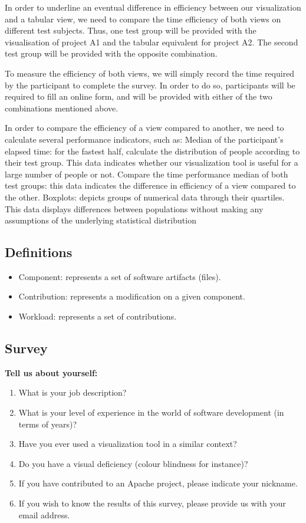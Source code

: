 In order to underline an eventual difference in efficiency between our visualization and a tabular view, we need to compare the time efficiency of both views on different test subjects. Thus, one test group will be provided with the visualisation of project A1 and the tabular equivalent for project A2. The second test group will be provided with the opposite combination.

To measure the efficiency of both views, we will simply record the time required by the participant to complete the survey. In order to do so, participants will be required to fill an online form, and will be provided with either of the two combinations mentioned above.

In order to compare the efficiency of a view compared to another, we need to calculate several performance indicators, such as:
Median of the participant’s elapsed time: for the fastest half, calculate the distribution of people according to their test group. This data indicates whether our visualization tool is useful for a large number of people or not.
Compare the time performance median of both test groups: this data indicates the difference in efficiency of a view compared to the other.
Boxplots: depicts groups of numerical data through their quartiles. This data displays differences between populations without making any assumptions of the underlying statistical distribution


\subsection{Definitions}
\begin{itemize}
\item Component: represents a set of software artifacts (files).
\item Contribution: represents a modification on a given component.
\item Workload: represents a set of contributions.
\end{itemize}

\subsection{Survey}

\textbf{Tell us about yourself:}
\begin{enumerate}
\item What is your job description?
\item What is your level of experience in the world of software development (in terms of years)?
\item Have you ever used a visualization tool in a similar context?
\item Do you have a visual deficiency (colour blindness for instance)?
\item If you have contributed to an Apache project, please indicate your nickname.
\item If you wish to know the results of this survey, please provide us with your email address.
\end{enumerate}

